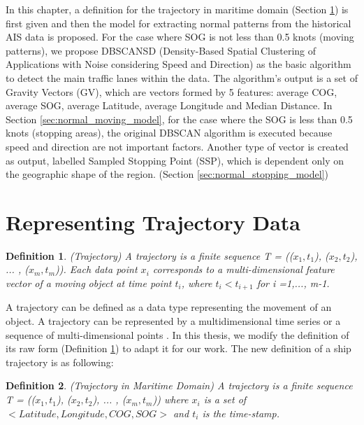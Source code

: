 \documentclass[12pt,glossary]{dalcsthesis}
\newtheorem{definition}{Definition}
\begin{document}
In this chapter, a definition for the trajectory in maritime domain (Section \ref{sec:trajectory_representation}) is first given and then the model for extracting normal patterns from the historical AIS data is proposed.  %
For the case where SOG is not less than 0.5 knots (moving patterns), we propose DBSCANSD (Density-Based Spatial Clustering of Applications with Noise considering Speed and Direction) as the basic algorithm to detect the main traffic lanes within the data. The algorithm's output is a set of Gravity Vectors (GV), which are vectors formed by 5 features: average COG, average SOG, average Latitude, average Longitude and Median Distance. In Section \ref{sec:normal_moving_model},  for the case where the SOG is less than 0.5 knots (stopping areas), the original DBSCAN \cite{DBScan96} algorithm is executed because speed and direction are not important factors. Another type of vector is created as output, labelled Sampled Stopping Point (SSP), which is dependent only on the geographic shape of the region. (Section \ref{sec:normal_stopping_model}) 

\section{Representing Trajectory Data} \label{sec:trajectory_representation}

\begin{definition}
\label{def:trajectory_raw}
(Trajectory) A trajectory is a finite sequence T = (($x_1, t_1$), ($x_2, t_2$), ... , ($x_m, t_m$)). Each data point $x_i$ corresponds to a multi-dimensional feature vector of a moving object at time point $t_i$, where $t_i < t_{i+1}$ for i =1,..., m-1.
\end{definition}

A trajectory can be defined as a data type representing the movement of an object. A trajectory can be represented by a multidimensional time series \cite{aggarwal2013data} or a sequence of multi-dimensional points \cite{Lee07}. In this thesis, we modify the definition of its raw form (Definition \ref{def:trajectory_raw}) \cite{phdthesis} to adapt it for our work. The new definition of a ship trajectory is as following:

\begin{definition}
\label{def:trajectory}
(Trajectory in Maritime Domain) A trajectory is a finite sequence T = (($x_1, t_1$), ($x_2, t_2$), ... , ($x_m, t_m$)) where $x_i$ is a set of $<Latitude, Longitude, COG, SOG>$ and $t_i$ is the time-stamp.
\end{definition}
\end{document}
